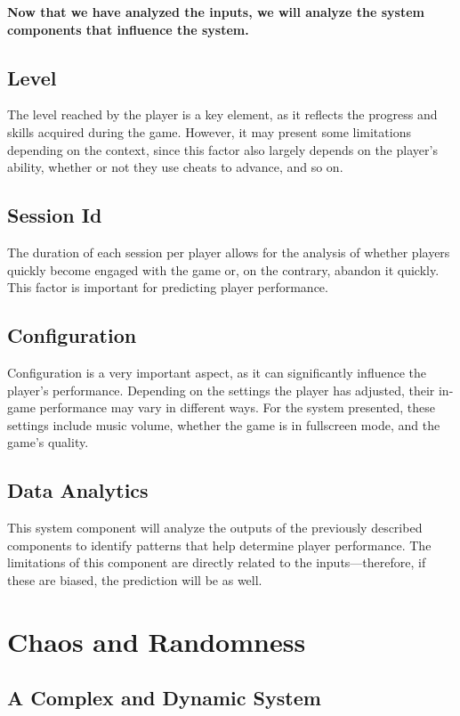 \documentclass{article}
\begin{document}
  \textbf{Now that we have analyzed the inputs, we will analyze the system components that influence the system.}
  
  \subsection*{Level}
  The level reached by the player is a key element, as it reflects the progress and skills acquired during the game. However, it may present some limitations depending on the context, since this factor also largely depends on the player's ability, whether or not they use cheats to advance, and so on.
  
  \subsection*{Session Id}
  The duration of each session per player allows for the analysis of whether players quickly become engaged with the game or, on the contrary, abandon it quickly. This factor is important for predicting player performance.
  
  \subsection*{Configuration}
  Configuration is a very important aspect, as it can significantly influence the player's performance. Depending on the settings the player has adjusted, their in-game performance may vary in different ways. For the system presented, these settings include music volume, whether the game is in fullscreen mode, and the game’s quality.
  
  \subsection*{Data Analytics}
  This system component will analyze the outputs of the previously described components to identify patterns that help determine player performance. The limitations of this component are directly related to the inputs—therefore, if these are biased, the prediction will be as well.
  

  \section*{Chaos and Randomness}

  \subsection*{A Complex and Dynamic System}
\end{document}
